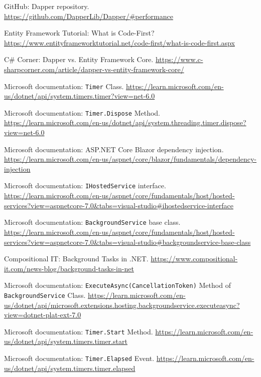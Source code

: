\begin{thebibliography}{99}
GitHub: Dapper repository.
\url{https://github.com/DapperLib/Dapper/#performance}

Entity Framework Tutorial: What is Code-First?
\url{https://www.entityframeworktutorial.net/code-first/what-is-code-first.aspx}

C\# Corner: Dapper vs. Entity Framework Core.
\url{https://www.c-sharpcorner.com/article/dapper-vs-entity-framework-core/}

Microsoft documentation: \verb|Timer| Class.
\url{https://learn.microsoft.com/en-us/dotnet/api/system.timers.timer?view=net-6.0}

Microsoft documentation: \verb|Timer.Dispose| Method.
\url{https://learn.microsoft.com/en-us/dotnet/api/system.threading.timer.dispose?view=net-6.0}

Microsoft documentation: ASP.NET Core Blazor dependency injection.
\url{https://learn.microsoft.com/en-us/aspnet/core/blazor/fundamentals/dependency-injection}

Microsoft documentation: \verb|IHostedService| interface.
\url{https://learn.microsoft.com/en-us/aspnet/core/fundamentals/host/hosted-services?view=aspnetcore-7.0&tabs=visual-studio\#ihostedservice-interface}

Microsoft documentation: \verb|BackgroundService| base class.
\url{https://learn.microsoft.com/en-us/aspnet/core/fundamentals/host/hosted-services?view=aspnetcore-7.0&tabs=visual-studio\#backgroundservice-base-class}

Compositional IT: Background Tasks in .NET.
\url{https://www.compositional-it.com/news-blog/background-tasks-in-net}

Microsoft documentation: \verb|ExecuteAsync(CancellationToken)| Method of \verb|BackgroundService| Class.
\url{https://learn.microsoft.com/en-us/dotnet/api/microsoft.extensions.hosting.backgroundservice.executeasync?view=dotnet-plat-ext-7.0}

Microsoft documentation: \verb|Timer.Start| Method.
\url{https://learn.microsoft.com/en-us/dotnet/api/system.timers.timer.start}

Microsoft documentation: \verb|Timer.Elapsed| Event.
\url{https://learn.microsoft.com/en-us/dotnet/api/system.timers.timer.elapsed}


\end{thebibliography}
